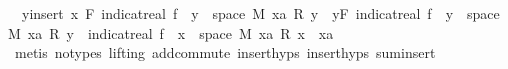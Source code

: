 \begin{isabellebody}
\ {\isacharasterisk}{\kern0pt}{\isacharcolon}{\kern0pt}\ {\isachardoublequoteopen}{\isacharparenleft}{\kern0pt}{\isasymSum}y{\isasymin}insert\ x\ F{\isachardot}{\kern0pt}\ indicat{\isacharunderscore}{\kern0pt}real\ {\isacharparenleft}{\kern0pt}f\ {\isacharminus}{\kern0pt}{\isacharbackquote}{\kern0pt}\ {\isacharbraceleft}{\kern0pt}y{\isacharbraceright}{\kern0pt}\ {\isasyminter}\ space\ M{\isacharparenright}{\kern0pt}\ xa\ {\isacharasterisk}{\kern0pt}\isactrlsub R\ y{\isacharparenright}{\kern0pt}\ {\isacharequal}{\kern0pt}\ {\isacharparenleft}{\kern0pt}{\isasymSum}y{\isasymin}F{\isachardot}{\kern0pt}\ indicat{\isacharunderscore}{\kern0pt}real\ {\isacharparenleft}{\kern0pt}f\ {\isacharminus}{\kern0pt}{\isacharbackquote}{\kern0pt}\ {\isacharbraceleft}{\kern0pt}y{\isacharbraceright}{\kern0pt}\ {\isasyminter}\ space\ M{\isacharparenright}{\kern0pt}\ xa\ {\isacharasterisk}{\kern0pt}\isactrlsub R\ y{\isacharparenright}{\kern0pt}\ {\isacharplus}{\kern0pt}\ indicat{\isacharunderscore}{\kern0pt}real\ {\isacharparenleft}{\kern0pt}f\ {\isacharminus}{\kern0pt}{\isacharbackquote}{\kern0pt}\ {\isacharbraceleft}{\kern0pt}x{\isacharbraceright}{\kern0pt}\ {\isasyminter}\ space\ M{\isacharparenright}{\kern0pt}\ xa\ {\isacharasterisk}{\kern0pt}\isactrlsub R\ x{\isachardoublequoteclose}\ \ xa\ \isamarkupfalse%
\ {\isacharparenleft}{\kern0pt}metis\ {\isacharparenleft}{\kern0pt}no{\isacharunderscore}{\kern0pt}types{\isacharcomma}{\kern0pt}\ lifting{\isacharparenright}{\kern0pt}\ add{\isachardot}{\kern0pt}commute\ insert{\isachardot}{\kern0pt}hyps{\isacharparenleft}{\kern0pt}{}{\isacharparenright}{\kern0pt}\ insert{\isachardot}{\kern0pt}hyps{\isacharparenleft}{\kern0pt}{}{\isacharparenright}{\kern0pt}\ sum{\isachardot}{\kern0pt}insert{\isacharparenright}{\kern0pt}\isanewline
\ \ \ \ \isamarkupfalse%

\end{isabellebody}
